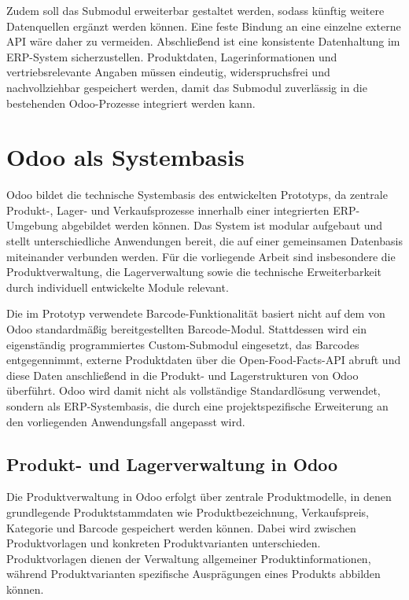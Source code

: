 \documentclass[12pt,a4paper]{article}
\begin{document}
Zudem soll das Submodul erweiterbar gestaltet werden, sodass künftig weitere Datenquellen ergänzt werden können. Eine feste Bindung an eine einzelne externe API wäre daher zu vermeiden. Abschließend ist eine konsistente Datenhaltung im ERP-System sicherzustellen. Produktdaten, Lagerinformationen und vertriebsrelevante Angaben müssen eindeutig, widerspruchsfrei und nachvollziehbar gespeichert werden, damit das Submodul zuverlässig in die bestehenden Odoo-Prozesse integriert werden kann.

\section{Odoo als Systembasis}

Odoo bildet die technische Systembasis des entwickelten Prototyps, da zentrale Produkt-, Lager- und Verkaufsprozesse innerhalb einer integrierten ERP-Umgebung abgebildet werden können. Das System ist modular aufgebaut und stellt unterschiedliche Anwendungen bereit, die auf einer gemeinsamen Datenbasis miteinander verbunden werden. Für die vorliegende Arbeit sind insbesondere die Produktverwaltung, die Lagerverwaltung sowie die technische Erweiterbarkeit durch individuell entwickelte Module relevant.

Die im Prototyp verwendete Barcode-Funktionalität basiert nicht auf dem von Odoo standardmäßig bereitgestellten Barcode-Modul. Stattdessen wird ein eigenständig programmiertes Custom-Submodul eingesetzt, das Barcodes entgegennimmt, externe Produktdaten über die Open-Food-Facts-API abruft und diese Daten anschließend in die Produkt- und Lagerstrukturen von Odoo überführt. Odoo wird damit nicht als vollständige Standardlösung verwendet, sondern als ERP-Systembasis, die durch eine projektspezifische Erweiterung an den vorliegenden Anwendungsfall angepasst wird.


\subsection{Produkt- und Lagerverwaltung in Odoo}

Die Produktverwaltung in Odoo erfolgt über zentrale Produktmodelle, in denen grundlegende Produktstammdaten wie Produktbezeichnung, Verkaufspreis, Kategorie und Barcode gespeichert werden können. Dabei wird zwischen Produktvorlagen und konkreten Produktvarianten unterschieden. Produktvorlagen dienen der Verwaltung allgemeiner Produktinformationen, während Produktvarianten spezifische Ausprägungen eines Produkts abbilden können.\autocite{odoo2026productmanagement}
\end{document}
